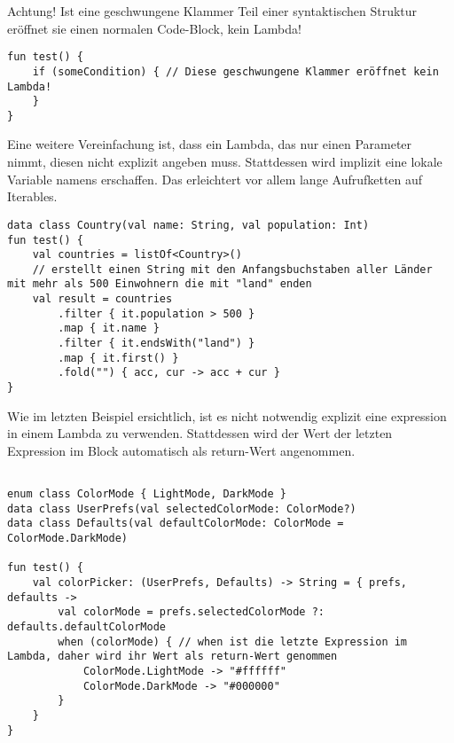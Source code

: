 Achtung!
Ist eine geschwungene Klammer Teil einer syntaktischen Struktur eröffnet sie einen normalen Code-Block, kein Lambda!

\begin{verbatim}
fun test() {
    if (someCondition) { // Diese geschwungene Klammer eröffnet kein Lambda!
    }
}
\end{verbatim}

Eine weitere Vereinfachung ist, dass ein Lambda, das nur einen Parameter nimmt, diesen nicht explizit angeben muss.
Stattdessen wird implizit eine lokale Variable namens  erschaffen.
Das erleichtert vor allem lange Aufrufketten auf Iterables.

\begin{verbatim}
data class Country(val name: String, val population: Int)
fun test() {
    val countries = listOf<Country>()
    // erstellt einen String mit den Anfangsbuchstaben aller Länder mit mehr als 500 Einwohnern die mit "land" enden
    val result = countries
        .filter { it.population > 500 }
        .map { it.name }
        .filter { it.endsWith("land") }
        .map { it.first() }
        .fold("") { acc, cur -> acc + cur }
}
\end{verbatim}

Wie im letzten Beispiel ersichtlich, ist es nicht notwendig explizit eine  expression in einem
Lambda zu verwenden.
Stattdessen wird der Wert der letzten Expression im Block automatisch als return-Wert angenommen.

\begin{verbatim}

enum class ColorMode { LightMode, DarkMode }
data class UserPrefs(val selectedColorMode: ColorMode?)
data class Defaults(val defaultColorMode: ColorMode = ColorMode.DarkMode)

fun test() {
    val colorPicker: (UserPrefs, Defaults) -> String = { prefs, defaults ->
        val colorMode = prefs.selectedColorMode ?: defaults.defaultColorMode
        when (colorMode) { // when ist die letzte Expression im Lambda, daher wird ihr Wert als return-Wert genommen
            ColorMode.LightMode -> "#ffffff"
            ColorMode.DarkMode -> "#000000"
        }
    }
}
\end{verbatim}

\renewcommand{\kapitelautor}{}
